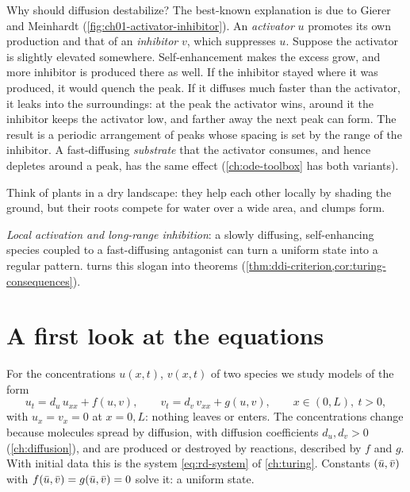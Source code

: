 Why should diffusion destabilize? The best-known explanation is due to Gierer and
Meinhardt \cite{GiererMeinhardt1972} (\cref{fig:ch01-activator-inhibitor}). An
\emph{activator} $u$ promotes its own production and that of an \emph{inhibitor}
$v$, which suppresses $u$. Suppose the activator is slightly elevated somewhere.
Self-enhancement makes the excess grow, and more inhibitor is produced there as
well. If the inhibitor stayed where it was produced, it would quench the peak. If
it diffuses much faster than the activator, it leaks into the
surroundings: at the peak the activator wins, around it the inhibitor keeps the
activator low, and farther away the next peak can form. The result is a periodic
arrangement of peaks whose spacing is set by the range of the inhibitor. A
fast-diffusing \emph{substrate} that the activator consumes, and hence depletes
around a peak, has the same effect (\cref{ch:ode-toolbox} has both variants).

Think of plants in a dry landscape: they help each other locally by shading the
ground, but their roots compete for water over a wide area, and clumps form.

\begin{keyidea}
\emph{Local activation and long-range inhibition}: a slowly diffusing,
self-enhancing species coupled to a fast-diffusing antagonist can turn a uniform
state into a regular pattern.  turns this slogan into theorems
(\cref{thm:ddi-criterion,cor:turing-consequences}).
\end{keyidea}

\section{A first look at the equations}\label{sec:intro-model}

For the concentrations $u(x,t)$, $v(x,t)$ of two species we study models of the
form
\begin{equation*}
  u_t = d_u\,u_{xx} + f(u,v),\qquad
  v_t = d_v\,v_{xx} + g(u,v),\qquad
  x\in(0,L),\ t>0,
\end{equation*}
with $u_x=v_x=0$ at $x=0,L$: nothing leaves or enters. The concentrations change
because molecules spread by diffusion, with diffusion coefficients $d_u,d_v>0$
(\cref{ch:diffusion}), and are produced or destroyed by reactions, described by $f$
and $g$. With initial data this is the system \eqref{eq:rd-system} of
\cref{ch:turing}. Constants $(\bar u,\bar v)$ with $f(\bar u,\bar v)=g(\bar u,\bar v)=0$ solve it:
a uniform state.

